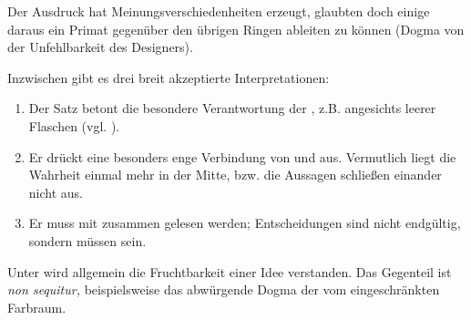 \label{sec:creactive}


Der Ausdruck   hat Meinungsverschiedenheiten erzeugt, glaubten doch einige  daraus ein Primat gegenüber den übrigen Ringen ableiten zu können (Dogma von der Unfehlbarkeit des Designers).

Inzwischen gibt es drei breit akzeptierte Interpretationen:
\begin{enumerate}
    \item Der Satz betont die besondere Verantwortung der , z.B. angesichts leerer Flaschen (vgl. ).
    \item Er drückt eine besonders enge Verbindung von  und  aus. Vermutlich liegt die Wahrheit einmal mehr in der Mitte, bzw. die Aussagen schließen einander nicht aus.
    \item Er muss mit  zusammen gelesen werden;  Entscheidungen sind nicht endgültig, sondern müssen  sein.  
\end{enumerate}
Unter  wird allgemein die Fruchtbarkeit einer Idee verstanden. Das Gegenteil ist \emph{non sequitur,} beispielsweise das abwürgende Dogma der  vom eingeschränkten Farbraum.


